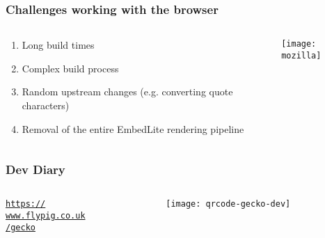 \documentclass[
	notes=none,
	aspectratio=169
]{beamer}
\begin{document}

\begin{frame}
\frametitle{Challenges working with the browser}

\begin{columns}[T]
\begin{column}[T]{0.5\textwidth}
\setlength{\parskip}{0.5em}

\vspace{1.5cm}
\begin{enumerate}
\setlength{\parskip}{0.5em}
\item Long build times
\item Complex build process
\item Random upstream changes (e.g. converting quote characters)
\item Removal of the entire EmbedLite rendering pipeline
\end{enumerate}

\end{column}
\begin{column}[T]{0.5\textwidth}
\setlength{\parskip}{0.5em}

\vspace{0.5cm}
\texttt{[image: mozilla]}

\end{column}
\end{columns}

\end{frame}
\note{
\begin{enumerate}
\item -
\end{enumerate}
}


\begin{frame}
\frametitle{Dev Diary}

\begin{columns}[T]
\begin{column}[T]{0.6\textwidth}
\setlength{\parskip}{0.5em}

\vspace{1.2cm}
{\huge
\href{https://www.flypig.co.uk/gecko}{{\tt https:// \\
www.flypig.co.uk \\
/gecko\\
}
}}

\end{column}
\begin{column}[T]{0.3\textwidth}
\setlength{\parskip}{0.5em}

\vspace{0.5cm}
\texttt{[image: qrcode-gecko-dev]}

\end{column}
\end{columns}

\end{frame}
\note{
}
\end{document}
